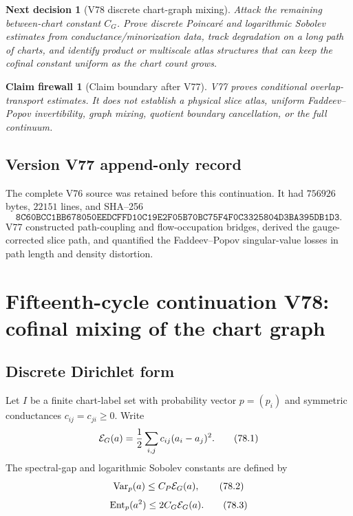 \documentclass[11pt]{article}
\newtheorem{firewall}[theorem]{Claim firewall}
\newtheorem{decision}[theorem]{Next decision}
\theoremstyle{remark}
\begin{document}
\begin{decision}[V78 discrete chart-graph mixing]
\label{dec:v15v77-next}
Attack the remaining between-chart constant \(C_G\).  Prove
discrete Poincar\'e and logarithmic Sobolev estimates from
conductance/minorization data, track degradation on a long path of
charts, and identify product or multiscale atlas structures that
can keep the cofinal constant uniform as the chart count grows.
\end{decision}

\begin{firewall}[Claim boundary after V77]
\label{fire:v15v77}
V77 proves conditional overlap-transport estimates.  It does not
establish a physical slice atlas, uniform Faddeev--Popov
invertibility, graph mixing, quotient boundary cancellation, or
the full continuum.
\end{firewall}

\section*{Version V77 append-only record}
The complete V76 source was retained before this continuation.  It
had \(756926\) bytes, \(22151\) lines, and SHA--256
\[
 \texttt{8C60BCC1BB678050EEDCFFD10C19E2F05B70BC75F4F0C3325804D3BA395DB1D3}.
\]
V77 constructed path-coupling and flow-occupation bridges, derived
the gauge-corrected slice path, and quantified the
Faddeev--Popov singular-value losses in path length and density
distortion.

\chapter{Fifteenth-cycle continuation V78: cofinal mixing of the chart graph}
\label{sec:v15v78}

\section{Discrete Dirichlet form}

Let \(I\) be a finite chart-label set with probability vector
\(p=(p_i)\) and symmetric conductances \(c_{ij}=c_{ji}\geq0\).
Write
\[
 {\cal E}_G(a)
 =
 \frac12\sum_{i,j}c_{ij}(a_i-a_j)^2.                  \tag{78.1}
\]
The spectral-gap and logarithmic Sobolev constants are defined by
\[
 \operatorname{Var}_p(a)
 \leq C_P{\cal E}_G(a),                               \tag{78.2}
\]
\[
 \operatorname{Ent}_p(a^2)
 \leq2C_G{\cal E}_G(a).                               \tag{78.3}
\]
\end{document}
